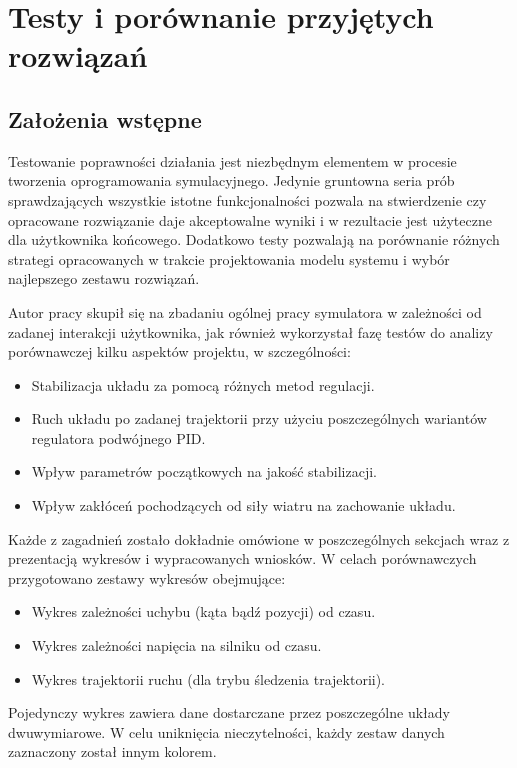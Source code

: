 \documentclass[12pt, oneside]{report}
\theoremstyle{definition}
\begin{document}
\chapter{Testy i porównanie przyjętych rozwiązań}
\section{Założenia wstępne}
Testowanie poprawności działania jest niezbędnym elementem w procesie tworzenia oprogramowania symulacyjnego. Jedynie gruntowna seria prób sprawdzających wszystkie istotne funkcjonalności pozwala na stwierdzenie czy opracowane rozwiązanie daje akceptowalne wyniki i w rezultacie jest użyteczne dla użytkownika końcowego. Dodatkowo testy pozwalają na porównanie różnych strategi opracowanych w trakcie projektowania modelu systemu i wybór najlepszego zestawu rozwiązań. 

Autor pracy skupił się na zbadaniu ogólnej pracy symulatora w zależności od zadanej interakcji użytkownika, jak również wykorzystał fazę testów do analizy porównawczej kilku aspektów projektu, w szczególności:
\begin{itemize}
\item Stabilizacja układu za pomocą różnych metod regulacji.
\item Ruch układu po zadanej trajektorii przy użyciu poszczególnych wariantów regulatora podwójnego PID.
\item Wpływ parametrów początkowych na jakość stabilizacji.
\item Wpływ zakłóceń pochodzących od siły wiatru na zachowanie układu.
\end{itemize}

Każde z zagadnień zostało dokładnie omówione w poszczególnych sekcjach wraz z prezentacją wykresów i wypracowanych wniosków. W celach porównawczych przygotowano zestawy wykresów obejmujące:
\begin{itemize}
\item Wykres zależności uchybu (kąta bądź pozycji) od czasu.
\item Wykres zależności napięcia na silniku od czasu.
\item Wykres trajektorii ruchu (dla trybu śledzenia trajektorii).
\end{itemize}

Pojedynczy wykres zawiera dane dostarczane przez poszczególne układy dwuwymiarowe. W celu uniknięcia nieczytelności, każdy zestaw danych zaznaczony został innym kolorem.
\end{document}
